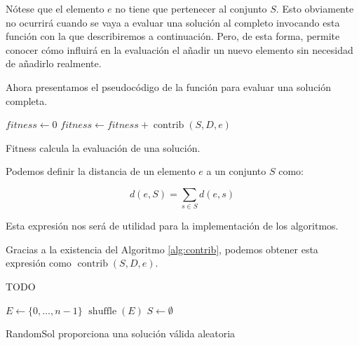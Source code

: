 \documentclass{article}
\begin{document}
Nótese que el elemento $e$ no tiene que pertenecer al conjunto $S$. Esto obviamente no ocurrirá cuando se vaya a evaluar una solución
al completo invocando esta función con la que describiremos a continuación. Pero, de esta forma, permite conocer cómo influirá en la evaluación el añadir
 un nuevo elemento sin necesidad de añadirlo realmente. 
 
 Ahora presentamos el pseudocódigo de la función para evaluar una solución completa.
 
 \begin{algorithm}[H]
 	\DontPrintSemicolon %
 	$fitness \gets 0$\;
 	 {
 		$fitness \gets fitness + \operatorname{contrib}(S,D,e)$ 
 	}
 	 
 	\caption{{\sc Fitness} calcula la evaluación de una solución.}
 	\label{alg:eval}
 \end{algorithm}

Podemos definir la distancia de un elemento $e$ a un conjunto $S$ como:

\begin{equation} \label{eq:distance-elem-set}
	d(e,S)=\sum_{s\in S} d(e,s)
\end{equation}

Esta expresión nos será de utilidad para la implementación de los algoritmos.

Gracias a la existencia del Algoritmo \ref{alg:contrib}, podemos obtener esta expresión como $\operatorname{contrib}(S,D,e)$.

TODO

\begin{algorithm}[H]
	\DontPrintSemicolon %
	$E \gets \{0,\ldots, n-1\}$ 
	$\operatorname{shuffle}(E)$\;
	$S \gets \emptyset$ 
	\;
	\caption{{\sc RandomSol} proporciona una solución válida aleatoria}
	\label{alg:randomsol}
\end{algorithm}
\end{document}
